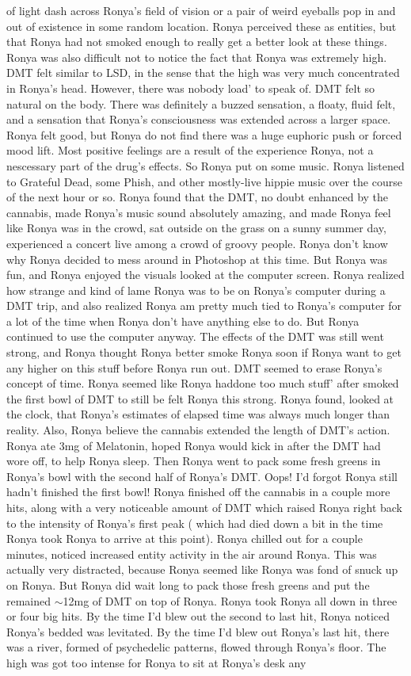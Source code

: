 \documentclass[12pt]{book}
\begin{document}
of light dash across Ronya's field of vision or a pair of weird eyeballs pop in and out of existence in some random location. Ronya perceived these as entities, but that Ronya had not smoked enough to really get a better look at these things. Ronya was also difficult not to notice the fact that Ronya was extremely high. DMT felt similar to LSD, in the sense that the high was very much concentrated in Ronya's head. However, there was nobody load' to speak of. DMT felt so natural on the body. There was definitely a buzzed sensation, a floaty, fluid felt, and a sensation that Ronya's consciousness was extended across a larger space. Ronya felt good, but Ronya do not find there was a huge euphoric push or forced mood lift. Most positive feelings are a result of the experience Ronya, not a nescessary part of the drug's effects. So Ronya put on some music. Ronya listened to Grateful Dead, some Phish, and other mostly-live hippie music over the course of the next hour or so. Ronya found that the DMT, no doubt enhanced by the cannabis, made Ronya's music sound absolutely amazing, and made Ronya feel like Ronya was in the crowd, sat outside on the grass on a sunny summer day, experienced a concert live among a crowd of groovy people. Ronya don't know why Ronya decided to mess around in Photoshop at this time. But Ronya was fun, and Ronya enjoyed the visuals looked at the computer screen. Ronya realized how strange and kind of lame Ronya was to be on Ronya's computer during a DMT trip, and also realized Ronya am pretty much tied to Ronya's computer for a lot of the time when Ronya don't have anything else to do. But Ronya continued to use the computer anyway. The effects of the DMT was still went strong, and Ronya thought Ronya better smoke Ronya soon if Ronya want to get any higher on this stuff before Ronya run out. DMT seemed to erase Ronya's concept of time. Ronya seemed like Ronya haddone too much stuff' after smoked the first bowl of DMT to still be felt Ronya this strong. Ronya found, looked at the clock, that Ronya's estimates of elapsed time was always much longer than reality. Also, Ronya believe the cannabis extended the length of DMT's action. Ronya ate 3mg of Melatonin, hoped Ronya would kick in after the DMT had wore off, to help Ronya sleep. Then Ronya went to pack some fresh greens in Ronya's bowl with the second half of Ronya's DMT. Oops! I'd forgot Ronya still hadn't finished the first bowl! Ronya finished off the cannabis in a couple more hits, along with a very noticeable amount of DMT which raised Ronya right back to the intensity of Ronya's first peak ( which had died down a bit in the time Ronya took Ronya to arrive at this point). Ronya chilled out for a couple minutes, noticed increased entity activity in the air around Ronya. This was actually very distracted, because Ronya seemed like Ronya was fond of snuck up on Ronya. But Ronya did wait long to pack those fresh greens and put the remained $\sim$12mg of DMT on top of Ronya. Ronya took Ronya all down in three or four big hits. By the time I'd blew out the second to last hit, Ronya noticed Ronya's bedded was levitated. By the time I'd blew out Ronya's last hit, there was a river, formed of psychedelic patterns, flowed through Ronya's floor. The high was got too intense for Ronya to sit at Ronya's desk any 
\end{document}
